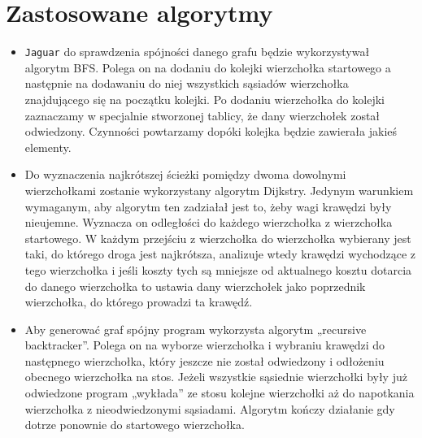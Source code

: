 \documentclass[]{article}
\begin{document}
\section{Zastosowane algorytmy}\label{header-n233}
\begin{itemize}
\item
\texttt{Jaguar} do sprawdzenia spójności danego grafu będzie wykorzystywał algorytm BFS. Polega on na dodaniu do kolejki wierzchołka startowego a następnie na dodawaniu do niej wszystkich sąsiadów wierzchołka znajdującego się na początku kolejki. Po dodaniu wierzchołka do kolejki zaznaczamy w specjalnie stworzonej tablicy, że dany wierzchołek został odwiedzony. Czynności powtarzamy dopóki kolejka będzie zawierała jakieś elementy.
\item
Do wyznaczenia najkrótszej ścieżki pomiędzy dwoma dowolnymi wierzchołkami zostanie wykorzystany algorytm Dijkstry. Jedynym warunkiem wymaganym, aby algorytm ten zadziałał jest to, żeby wagi krawędzi były nieujemne. Wyznacza on odległości do każdego wierzchołka z wierzchołka startowego. W każdym przejściu z wierzchołka do wierzchołka wybierany jest taki, do którego droga jest najkrótsza, analizuje wtedy krawędzi wychodzące z tego wierzchołka i jeśli koszty tych są mniejsze od aktualnego kosztu dotarcia do danego wierzchołka to ustawia dany wierzchołek jako poprzednik wierzchołka, do którego prowadzi ta krawędź.

\item
Aby generować graf spójny program wykorzysta algorytm „recursive backtracker”. Polega on na wyborze wierzchołka i wybraniu krawędzi do następnego wierzchołka, który jeszcze nie został odwiedzony i odłożeniu obecnego wierzchołka na stos. Jeżeli wszystkie sąsiednie wierzchołki były już odwiedzone program „wykłada” ze stosu kolejne wierzchołki aż do napotkania wierzchołka z nieodwiedzonymi sąsiadami. Algorytm kończy działanie gdy dotrze ponownie do startowego wierzchołka.
\end{itemize}
\end{document}
